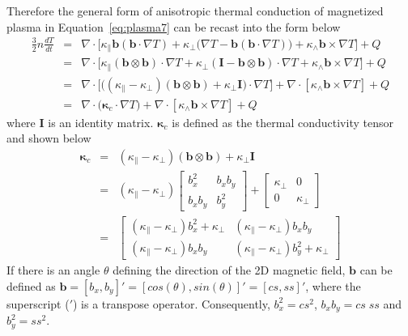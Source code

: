 \documentclass[runningheads]{llncs}
\begin{document}
Therefore the general form of anisotropic thermal conduction of magnetized plasma in Equation~\eqref{eq:plasma7} can be recast into the form below
\begin{eqnarray}
\frac{3}{2} n \frac{dT}{dt} &=& \nabla \cdot \Big[\kappa_{\parallel} \bm{b}(\bm{b}\cdot \nabla T) + \kappa_{\perp}\big(\nabla T - \bm{b}(\bm{b}\cdot \nabla T)\big) + \kappa_{\wedge}\bm{b}\times\nabla T\Big] + Q \nonumber\\
&=& \nabla \cdot \Big[\kappa_{\parallel} (\bm{b}\otimes \bm{b}) \cdot \nabla T + \kappa_{\perp}(\bm{I}-\bm{b}\otimes\bm{b})\cdot\nabla T + \kappa_{\wedge}\bm{b}\times\nabla T\Big] + Q \nonumber\\
&=& \nabla \cdot \Big[\big((\kappa_{\parallel}-\kappa_{\perp}) (\bm{b}\otimes \bm{b})  + \kappa_{\perp}\bm{I}\big)\cdot\nabla T\Big] + \nabla \cdot [\kappa_{\wedge}\bm{b}\times\nabla T] + Q \nonumber\\
&=& \nabla \cdot \big(\bm{\kappa}_c \cdot \nabla T \big) + \nabla \cdot [\kappa_{\wedge}\bm{b}\times\nabla T] + Q \label{eq:plasma9}
\end{eqnarray}
where $\bm{I}$ is an identity matrix. $\bm{\kappa}_c$ is defined as the thermal conductivity tensor and shown below
\begin{eqnarray}
\bm{\kappa}_c &=& (\kappa_{\parallel}-\kappa_{\perp}) (\bm{b}\otimes \bm{b})  + \kappa_{\perp}\bm{I} \nonumber\\
&=& (\kappa_{\parallel}-\kappa_{\perp}) \begin{bmatrix}
b^2_x & b_x b_y \\ b_x b_y & b^2_y 
\end{bmatrix} + \begin{bmatrix}
\kappa_{\perp} & 0\\ 0 &  \kappa_{\perp}
\end{bmatrix} \nonumber\\
&=& \begin{bmatrix}
(\kappa_{\parallel}-\kappa_{\perp}) b^2_x + \kappa_{\perp} & (\kappa_{\parallel}-\kappa_{\perp}) b_x b_y\\
(\kappa_{\parallel}-\kappa_{\perp}) b_x b_y & (\kappa_{\parallel}-\kappa_{\perp}) b^2_y + \kappa_{\perp} 
\end{bmatrix}
\end{eqnarray}
If there is an angle $\theta$ defining the direction of the 2D magnetic field, $\bm{b}$ can be defined as $\bm{b} = [b_x, b_y]' = [cos(\theta), sin(\theta)]' = [cs, ss]'$, where the superscript ($'$) is a transpose operator. Consequently, $b^2_x = cs^2$, $b_x b_y = cs \; ss$ and $b^2_y = ss^2$.
\end{document}
